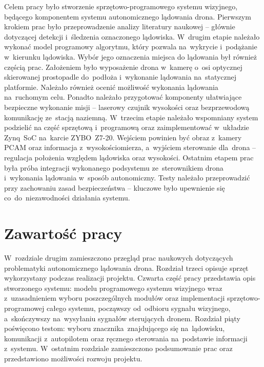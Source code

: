 Celem pracy było stworzenie sprzętowo-programowego systemu wizyjnego, będącego komponentem systemu autonomicznego lądowania drona. 
Pierwszym krokiem prac było przeprowadzenie analizy literatury naukowej -- głównie dotyczącej detekcji i~śledzenia oznaczonego lądowiska. 
W~drugim etapie należało wykonać model programowy algorytmu, który pozwala na~wykrycie i~podążanie w~kierunku  lądowiska. 
Wybór jego oznaczenia miejsca do lądowania był również częścią prac. 
Założeniem było wyposażenie drona w~kamerę o~osi optycznej skierowanej prostopadle do~podłoża i~wykonanie lądowania na~statycznej platformie. 
Należało również ocenić możliwość wykonania lądowania na~ruchomym celu.
Ponadto należało przygotować komponenty ułatwiające bezpieczne wykonanie misji -- laserowy czujnik wysokości oraz bezprzewodową komunikację ze~stacją naziemną. 
W~trzecim etapie należało wspomniany system podzielić na część sprzętową i~programową oraz zaimplementować w~układzie Zynq~SoC na~karcie ZYBO~Z7-20. 
Wejściem powinien być obraz z~kamery PCAM oraz informacja z~wysokościomierza, a~wyjściem sterowanie dla~drona -- regulacja położenia względem lądowiska oraz wysokości.
Ostatnim etapem prac była próba integracji wykonanego podsystemu ze~sterownikiem drona i~wykonania lądowania w~sposób autonomiczny. 
Testy należało przeprowadzić przy zachowaniu zasad bezpieczeństwa -- kluczowe było upewnienie się co~do~niezawodności działania systemu.



\section{Zawartość pracy}
\label{sec:zawartoscPracy}

W~rozdziale drugim zamieszczono przegląd prac naukowych dotyczących problematyki autonomicznego lądowania drona. 
Rozdział trzeci opisuje sprzęt wykorzystany podczas realizacji projektu. 
Czwarta część pracy przedstawia opis stworzonego systemu: modelu programowego systemu wizyjnego wraz z~uzasadnieniem wyboru poszczególnych modułów oraz implementacji sprzętowo-programowej całego systemu, począwszy od~odbioru sygnału wizyjnego, a~skończywszy na~wysyłaniu sygnałów sterujących dronem. 
Rozdział piąty poświęcono testom: wyboru znacznika~znajdującego się na~lądowisku, komunikacji z~autopilotem oraz ręcznego sterowania na~podstawie informacji z~systemu. 
W~ostatnim rozdziale zamieszczono podsumowanie prac oraz przedstawiono możliwości rozwoju projektu.

